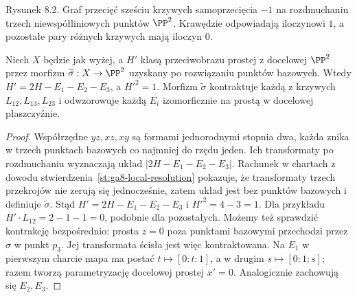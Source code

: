 \begin{center}

{\small Rysunek 8.2. Graf przecięć sześciu krzywych
samoprzecięcia $-1$ na rozdmuchaniu trzech niewspółliniowych
punktów $\PP^2$. Krawędzie odpowiadają iloczynowi $1$,
a pozostałe pary różnych krzywych mają iloczyn $0$.}\par
\end{center}

\begin{stwierdzenie}
\label{st:ga8-cremona-linear}
Niech $X$ będzie jak wyżej, a $H'$ klasą przeciwobrazu
prostej z docelowej $\PP^2$ przez morfizm
$\widetilde\sigma:X\to\PP^2$ uzyskany po rozwiązaniu
punktów bazowych. Wtedy
$H'=2H-E_1-E_2-E_3$, a $H'^2=1$.
Morfizm $\widetilde\sigma$ kontraktuje każdą z krzywych
$L_{12},L_{13},L_{23}$ i odwzorowuje każdą $E_i$
izomorficznie na prostą w docelowej płaszczyźnie.
\end{stwierdzenie}
\begin{proof}
Współrzędne $yz,xz,xy$ są formami jednorodnymi
stopnia dwa, każda znika w trzech punktach bazowych
co najmniej do rzędu jeden. Ich transformaty po
rozdmuchaniu wyznaczają układ $|2H-E_1-E_2-E_3|$.
Rachunek w chartach z dowodu
stwierdzenia~\ref{st:ga8-local-resolution} pokazuje,
że transformaty trzech przekrojów nie zerują się
jednocześnie, zatem układ jest bez punktów bazowych
i definiuje $\widetilde\sigma$.
Stąd $H'=2H-E_1-E_2-E_3$ i $H'^2=4-3=1$.
Dla przykładu $H'\cdot L_{12}=2-1-1=0$,
podobnie dla pozostałych. Możemy też sprawdzić
kontrakcję bezpośrednio: prosta $z=0$ poza punktami
bazowymi przechodzi przez $\sigma$ w punkt $p_3$.
Jej transformata ścisła jest więc kontraktowana.
Na $E_1$ w pierwszym charcie mapa ma postać
$t\mapsto[0:t:1]$, a w drugim $s\mapsto[0:1:s]$;
razem tworzą parametryzację docelowej prostej $x'=0$.
Analogicznie zachowują się $E_2,E_3$.
\end{proof}

